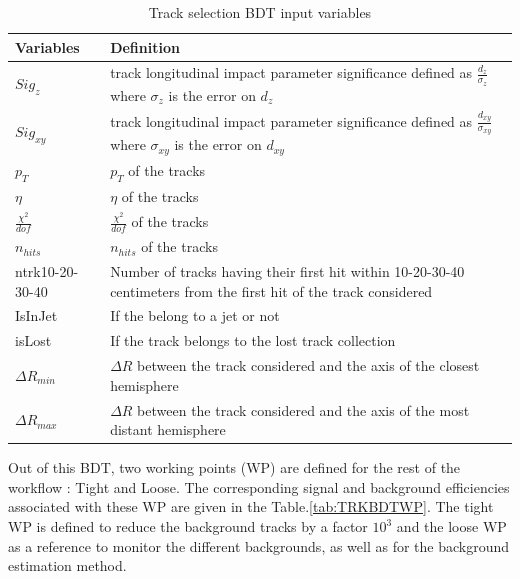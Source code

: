 \documentclass{cernatlasnote}
\begin{document}
        \begin{table}[h]
        \centering
        \begin{tabular}{|m{6cm}||m{9cm}|}
        \hline
        \rowcolor{lightgray} 
         \centering Variables & Definition\\
        \hline
        \centering $Sig_{z}$ & track longitudinal impact parameter significance defined as $\frac{d_{z}}{\sigma_{z}}$  where $\sigma_{z}$ is the error on $d_{z}$ \\
        \hline
        \centering$Sig_{xy}$ & track longitudinal impact parameter significance defined as $\frac{d_{xy}}{\sigma_{xy}}$  where $\sigma_{xy}$ is the error on $d_{xy}$ \\
        \hline
        \centering $p_{T}$  &   $p_{T}$ of the tracks \\
        \hline
        \centering $\eta$ & $\eta$ of the tracks  \\
        \hline
        \centering $\frac{\chi^2}{dof}$  &   $\frac{\chi^2}{dof}$ of the tracks\\     
        \hline
        \centering $n_{hits}$  &   $n_{hits}$ of the tracks\\
        \hline
        \centering ntrk10-20-30-40 & Number of tracks having their first hit within 10-20-30-40 centimeters from the first hit of the track considered\\
        \hline
        \centering IsInJet & If the belong to a jet or not\\
        \hline
        \centering isLost & If the track belongs to the lost track collection\\
        \hline
        \centering $\Delta R_{min}$ & $\Delta R$ between the track considered and the axis of the closest hemisphere\\
        \hline
        \centering $\Delta R_{max}$ & $\Delta R$ between the track considered and the axis of the most distant hemisphere\\
        \hline
        \end{tabular}
        \caption{Track selection BDT input variables}
        \label{tab:TRKBDTVAR}
        \end{table}
        
        Out of this BDT, two working points (WP) are defined for the rest of the workflow : Tight and Loose. The corresponding signal and background efficiencies associated with these WP are given in the Table.\ref{tab:TRKBDTWP}. The tight WP is defined to reduce the background tracks by a factor $10^3$ and the loose WP as a reference to monitor the different backgrounds, as well as for the background estimation method. 
\end{document}
